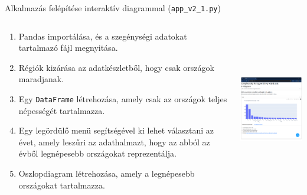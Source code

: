 \documentclass[english, aspectratio=169]{beamer}
\begin{document}
	\begin{frame}{Alkalmazás felépítése interaktív diagrammal (\texttt{app\_v2\_1.py})}
		\begin{columns}
			\begin{column}{.5\textwidth}
				\begin{enumerate}
					\item Pandas importálása, és a szegénységi adatokat tartalmazó fájl megnyitása. 
					\item Régiók kizárása az adatkészletből, hogy csak országok maradjanak.
					\item Egy \texttt{DataFrame} létrehozása, amely csak az országok teljes népességét tartalmazza. 
					\item Egy legördülő menü segítségével ki lehet választani az évet, amely leszűri az adathalmazt, hogy az abból az évből legnépesebb országokat reprezentálja.
					\item Oszlopdiagram létrehozása, amely a legnépesebb országokat tartalmazza. 
				\end{enumerate}
			\end{column}
			\begin{column}{.5\textwidth}
				\begin{center}
					\includegraphics[width=7cm, height=7cm, keepaspectratio]{images/plots_5.png}
				\end{center}
			\end{column}
		\end{columns}
	\end{frame}
	
\end{document}
